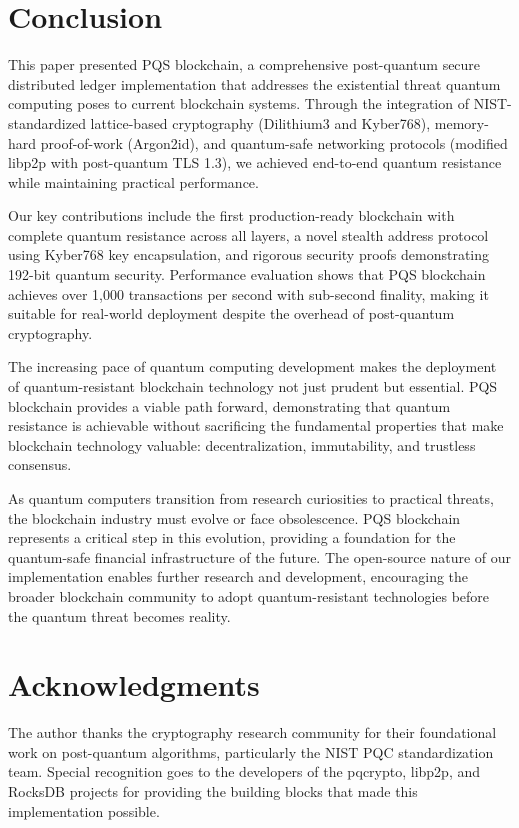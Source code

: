 \documentclass[12pt,a4paper]{article}
\begin{document}
\section{Conclusion}

This paper presented PQS blockchain, a comprehensive post-quantum secure distributed ledger implementation that addresses the existential threat quantum computing poses to current blockchain systems. Through the integration of NIST-standardized lattice-based cryptography (Dilithium3 and Kyber768), memory-hard proof-of-work (Argon2id), and quantum-safe networking protocols (modified libp2p with post-quantum TLS 1.3), we achieved end-to-end quantum resistance while maintaining practical performance.

Our key contributions include the first production-ready blockchain with complete quantum resistance across all layers, a novel stealth address protocol using Kyber768 key encapsulation, and rigorous security proofs demonstrating 192-bit quantum security. Performance evaluation shows that PQS blockchain achieves over 1,000 transactions per second with sub-second finality, making it suitable for real-world deployment despite the overhead of post-quantum cryptography.

The increasing pace of quantum computing development makes the deployment of quantum-resistant blockchain technology not just prudent but essential. PQS blockchain provides a viable path forward, demonstrating that quantum resistance is achievable without sacrificing the fundamental properties that make blockchain technology valuable: decentralization, immutability, and trustless consensus.

As quantum computers transition from research curiosities to practical threats, the blockchain industry must evolve or face obsolescence. PQS blockchain represents a critical step in this evolution, providing a foundation for the quantum-safe financial infrastructure of the future. The open-source nature of our implementation enables further research and development, encouraging the broader blockchain community to adopt quantum-resistant technologies before the quantum threat becomes reality.

\section*{Acknowledgments}

The author thanks the cryptography research community for their foundational work on post-quantum algorithms, particularly the NIST PQC standardization team. Special recognition goes to the developers of the pqcrypto, libp2p, and RocksDB projects for providing the building blocks that made this implementation possible.
\end{document}
